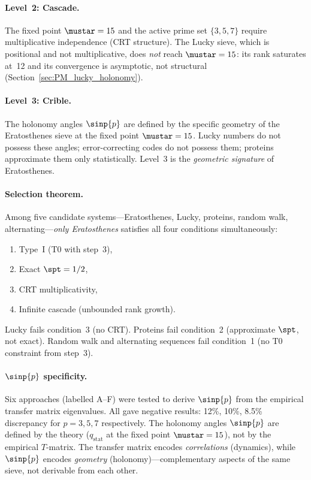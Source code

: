 \documentclass[12pt,a4paper]{article}
\begin{document}
\paragraph{Level~2: Cascade.}
The fixed point $\mustar = 15$ and the active prime set $\{3,5,7\}$
require multiplicative independence (CRT structure).  The Lucky sieve,
which is positional and not multiplicative, does \emph{not} reach
$\mustar = 15$: its rank saturates at~12 and its convergence is
asymptotic, not structural (Section~\ref{sec:PM_lucky_holonomy}).

\paragraph{Level~3: Crible.}
The holonomy angles $\sinp{p}$ are defined by the specific geometry
of the Eratosthenes sieve at the fixed point $\mustar = 15$.  Lucky
numbers do not possess these angles; error-correcting codes do not
possess them; proteins approximate them only statistically.
Level~3 is the \emph{geometric signature} of Eratosthenes.

\paragraph{Selection theorem.}
\mTHM
Among five candidate systems---Eratosthenes, Lucky, proteins, random
walk, alternating---\emph{only Eratosthenes} satisfies all four
conditions simultaneously:
\begin{enumerate}[nosep]
  \item Type~I (T0 with step~3),
  \item Exact $\spt = 1/2$,
  \item CRT multiplicativity,
  \item Infinite cascade (unbounded rank growth).
\end{enumerate}
Lucky fails condition~3 (no CRT).  Proteins fail condition~2 (approximate
$\spt$, not exact).  Random walk and alternating sequences fail
condition~1 (no T0 constraint from step~3).

\paragraph{$\sinp{p}$ specificity.}
Six approaches (labelled A--F) were tested to derive $\sinp{p}$ from
the empirical transfer matrix eigenvalues.  All gave negative results:
12\%, 10\%, 8.5\% discrepancy for $p = 3, 5, 7$ respectively.  The
holonomy angles $\sinp{p}$ are defined by the theory ($q_{\mathrm{stat}}$
at the fixed point $\mustar = 15$), not by the empirical $T$-matrix.
The transfer matrix encodes \emph{correlations} (dynamics), while
$\sinp{p}$ encodes \emph{geometry} (holonomy)---complementary aspects
of the same sieve, not derivable from each other.
\end{document}
